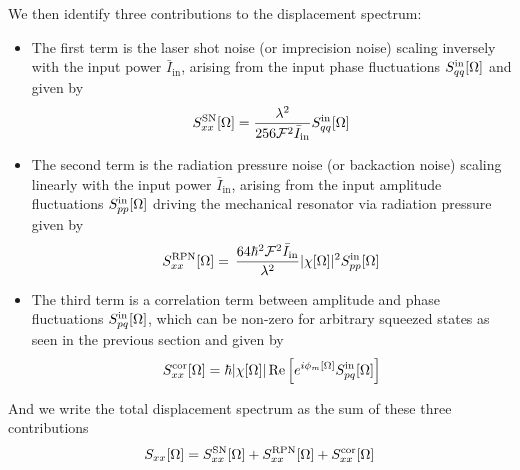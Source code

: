 We then identify three contributions to the displacement spectrum:
\begin{itemize}
  \item The first term is the laser shot noise (or imprecision noise) scaling inversely with the input power $\bar{I}_\mathrm{in}$, arising from the input phase fluctuations $S_{qq}^{\rm in}[\Omega]$ and given by
  \begin{equation}
    S_{xx}^{\rm SN}[\Omega] = \dfrac{\lambda^2}{256 \mathcal{F}^2 \bar{I}_\mathrm{in}} S_{qq}^{\rm in}[\Omega]
  \end{equation}
  \item The second term is the radiation pressure noise (or backaction noise) scaling linearly with the input power $\bar{I}_\mathrm{in}$, arising from the input amplitude fluctuations $S_{pp}^{\rm in}[\Omega]$ driving the mechanical resonator via radiation pressure given by 
  \begin{equation}
    S_{xx}^{\rm RPN}[\Omega] = \, \dfrac{64 \hbar^2 \mathcal{F}^2 \bar{I}_\mathrm{in}}{\lambda^2}|\chi[\Omega]|^2 S_{pp}^{\rm in}[\Omega]
  \end{equation}
  \item The third term is a correlation term between amplitude and phase fluctuations $S_{pq}^{\rm in}[\Omega]$, which can be non-zero for arbitrary squeezed states as seen in the previous section and given by
  \begin{equation}
    S_{xx}^{\rm cor}[\Omega] = \hbar |\chi[\Omega]|\Re\Big[ e^{i\phi_m[\Omega]} S_{pq}^{\rm in}[\Omega]\Big]
  \end{equation}
\end{itemize}
And we write the total displacement spectrum as the sum of these three contributions
\begin{equation}
  S_{xx}[\Omega] = S_{xx}^{\rm SN}[\Omega] + S_{xx}^{\rm RPN}[\Omega] + S_{xx}^{\rm cor}[\Omega]
\end{equation}

